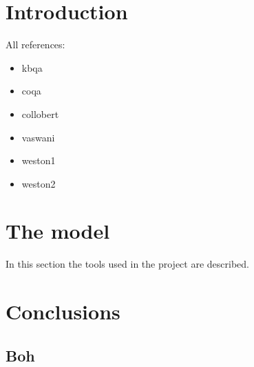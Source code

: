 \documentclass[12pt,a4paper,hidelinks]{article}
\begin{document}

\tableofcontents
\thispagestyle{empty}
\newpage
\setcounter{page}{1}


\section{Introduction}\label{sec:intro}

All references:
\begin{itemize}
  \item kbqa~\cite{kbqa}    
  \item coqa~\cite{coqa}
  \item collobert~\cite{Collobert}
  \item vaswani~\cite{vaswani}
  \item weston1~\cite{weston-tracking}
  \item weston2~\cite{weston-reading}
\end{itemize}

\section{The model}\label{sec:model}
In this section the tools used in the project are described.

\section{Conclusions}\label{sec:conclusions}

\subsection{Boh}



\end{document}
